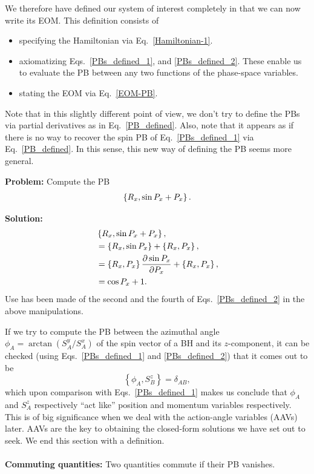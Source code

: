 We therefore have defined our system of interest completely in that 
we can now write its EOM. This definition consists of
\begin{itemize}
\item specifying the Hamiltonian via Eq.~\eqref{Hamiltonian-1}.
\item axiomatizing Eqs.~\eqref{PBs_defined_1}, and \eqref{PBs_defined_2}.
 These enable us to evaluate the PB between any 
two functions of the phase-space variables.
\item stating the EOM via Eq.~\eqref{EOM-PB}.
\end{itemize}
Note that in this slightly different point of view,
we don't try to define the PBs via partial derivatives 
as in Eq.~\eqref{PB_defined}. Also, note that it appears as if there is no way
to recover the spin PB of Eq.~\eqref{PBs_defined_1} via Eq.~\eqref{PB_defined}.
In this sense, this new way of defining the PB seems more general.





\begin{Exercise}    \label{exercise-1}
\textbf{Problem:} Compute the PB 
\begin{align}
\left\lbrace R_x , \sin  P_x   +   P_x   \right\rbrace.
\end{align}

\textbf{Solution:} 
\begin{align}
& \left\lbrace R_x , \sin  P_x   +   P_x   \right\rbrace  ,   \\ 
& =  \left\lbrace R_x,  \sin  P_x   \right\rbrace  +  \left\lbrace R_x,   P_x   \right\rbrace  ,  \\
& =  \left\lbrace R_x,    P_x   \right\rbrace  \frac{\partial \sin P_x}{\partial P_x}  +  \left\lbrace R_x,   P_x   \right\rbrace  ,  \\
&  =   \cos P_x + 1.
\end{align}
Use has been made of the second and the fourth of Eqs.~\eqref{PBs_defined_2}
in the above manipulations.
\end{Exercise}



If we try to compute the PB between the azimuthal angle 
$\phi_{A} = \arctan (S_A^y/S_A^x)$ of the spin vector
of a BH and its $z$-component, it can be checked (using 
Eqs.~\eqref{PBs_defined_1} and \eqref{PBs_defined_2}) that it comes out to be
\begin{equation}
\left\{\phi_{A}, S_{B}^{z}\right\}=\delta_{A B}  ,     \label{spin-PB}
\end{equation}
which upon comparison with Eqs.~\eqref{PBs_defined_1}
makes us conclude that $\phi_A$ and $S_{A}^{z}$ respectively ``act
like'' position and momentum variables respectively. This is of big significance 
when we deal with the action-angle variables (AAVs) later. AAVs are the key
to obtaining the closed-form solutions we have set out to seek. We end this section 
with a definition. \\ \\
\textbf{Commuting quantities: } Two quantities {commute} if their PB vanishes.




